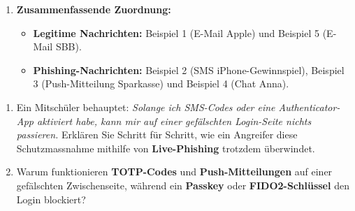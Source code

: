 \documentclass[12pt,a4paper]{article}
\begin{document}
\begin{solutionbox}
\begin{enumerate}[label=\alph*)]
\begin{enumerate}
        \item \textbf{Chat Anna (Phishing):}
        \begin{itemize}
            \item \textit{Absender:} Anna, scheinbar eine bekannte Kontaktperson.
            \item \textit{Link:} \texttt{umfrage-geschenk.de}, keine erkennbare offizielle Unternehmensdomain.
            \item \textit{Tonfall:} Freundlich und verlockend durch einen 50-Euro-Gutschein.
            \item \textit{Verdächtiges Merkmal:} Ungewöhnliches Gutscheinangebot über einen externen Link.
        \end{itemize}

        \item \textbf{E-Mail SBB (Legitim):}
        \begin{itemize}
            \item \textit{Absender:} \texttt{service@sbb.ch}, offizielle SBB-Domain.
            \item \textit{Domain:} \texttt{sbb.ch}, offizielle Webseite der Schweizerischen Bundesbahnen.
            \item \textit{Tonfall:} Sachlich und informativ.
            \item \textit{Vertrauenswürdige Merkmale:} Konkrete Buchungsbestätigung und passender Reisebezug.
        \end{itemize}
    \end{enumerate}

    \item \textbf{Zusammenfassende Zuordnung:}
    \begin{itemize}
        \item \textbf{Legitime Nachrichten:} Beispiel 1 (E-Mail Apple) und Beispiel 5 (E-Mail SBB).
        \item \textbf{Phishing-Nachrichten:} Beispiel 2 (SMS iPhone-Gewinnspiel), Beispiel 3 (Push-Mitteilung Sparkasse) und Beispiel 4 (Chat Anna).
    \end{itemize}
\end{enumerate}
\end{solutionbox}

\begin{taskbox}
\begin{enumerate}[label=\alph*)]
    \item Ein Mitschüler behauptet: \textit{Solange ich SMS-Codes oder eine Authenticator-App aktiviert habe, kann mir auf einer gefälschten Login-Seite nichts passieren.} Erklären Sie Schritt für Schritt, wie ein Angreifer diese Schutzmassnahme mithilfe von \textbf{Live-Phishing} trotzdem überwindet.
    \item Warum funktionieren \textbf{TOTP-Codes} und \textbf{Push-Mitteilungen} auf einer gefälschten Zwischenseite, während ein \textbf{Passkey} oder \textbf{FIDO2-Schlüssel} den Login blockiert?
\end{enumerate}
\end{taskbox}
\end{document}
